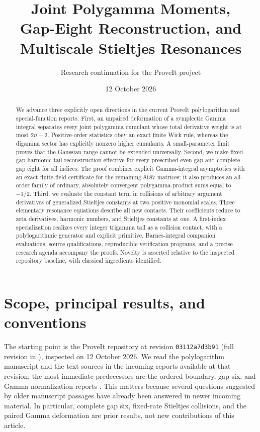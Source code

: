 \documentclass[11pt,a4paper]{article}
\title{\bfseries Joint Polygamma Moments,\\
Gap-Eight Reconstruction, and\\
Multiscale Stieltjes Resonances}
\author{Research continuation for the ProveIt project}
\date{12 October 2026}
\numberwithin{equation}{section}
\theoremstyle{definition}
\theoremstyle{remark}
\begin{document}
\maketitle
\begin{abstract}
We advance three explicitly open directions in the current ProveIt
polylogarithm and special-function reports. First, an unpaired deformation
of a symplectic Gamma integral separates every joint polygamma cumulant
whose total derivative weight is at most $2n+2$. Positive-order statistics
obey an exact finite Wick rule, whereas the digamma sector has explicitly
nonzero higher cumulants. A small-parameter limit proves that the Gaussian
range cannot be extended universally. Second, we make fixed-gap harmonic
tail reconstruction effective for every prescribed even gap and complete
gap eight for all indices. The proof combines explicit Gamma-integral
asymptotics with an exact finite-field certificate for the remaining
$8187$ matrices; it also produces an all-order family of ordinary,
absolutely convergent polygamma-product sums equal to $-1/2$.
Third, we evaluate the constant term in collisions of arbitrary argument
derivatives of generalized Stieltjes constants at two positive monomial
scales. Three elementary resonance equations describe all new contacts.
Their coefficients reduce to zeta derivatives, harmonic numbers, and
Stieltjes constants at one. A first-index specialization realizes every
integer trigamma tail as a collision contact, with a polylogarithmic
generator and explicit primitive. Barnes-integral companion evaluations,
source qualifications, reproducible verification programs, and a precise
research agenda accompany the proofs. Novelty is asserted relative to
the inspected repository baseline, with classical ingredients identified.
\end{abstract}
\tableofcontents
\clearpage

\section{Scope, principal results, and conventions}
\label{intro:section}

The starting point is the ProveIt repository at revision
\texttt{03112a7d3b91} (full revision in \cite{ProveIt}), inspected on
12 October 2026. We read the polylogarithm manuscript and the text sources
in the incoming reports available at that revision; the most immediate
predecessors are the ordered-boundary, gap-six, and Gamma-normalization
reports \cite{ProveIt,OrderedIncoming,GapSix,GammaIncoming}.
This matters because several questions suggested by older manuscript
passages have already been answered in newer incoming material.
In particular, complete gap six, fixed-rate Stieltjes collisions, and
the paired Gamma deformation are prior results, not new contributions
of this article.
\end{document}
